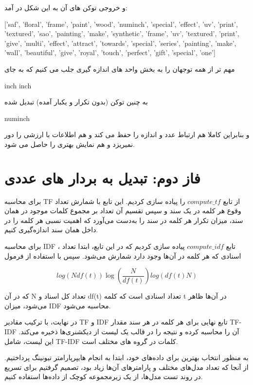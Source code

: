\documentclass[a4paper,12pt]{article}
\begin{document}
	و خروجی توکن های آن به این شکل در آمد:
	\begin{latin}
		['saf', 'floral', 'frame', 'paint', 'wood', 'numinch', 'special', 'effect', 'uv', 'print', 'textured', 'sao', 'painting', 'make', 'synthetic', 'frame', 'uv', 'textured', 'print', 'give', 'multi', 'effect', 'attract', 'towards', 'special', 'series', 'painting', 'make', 'wall', 'beautiful', 'give', 'royal', 'touch', 'perfect', 'gift', 'special', 'one']
	\end{latin}
	
	مهم تر از همه توجهان را به بخش واحد های اندازه گیری جلب می کنیم که به جای 
	\begin{latin}
		inch inch 
	\end{latin}
	به چنین توکن (بدون تکرار و یکبار آمده) تبدیل شده
	\begin{latin}
		numinch
	\end{latin}
	و بنابراین کاملا هم ارتباط عدد و اندازه را حفظ می کند و هم اطلاعات با ارزشی را دور نمیریزد و هم نمایش بهتری را حاصل می شود.
	
	\pagebreak
	
	\section{فاز دوم: تبدیل به بردار های عددی}
	
	برای محاسبه TF از تابع
	$compute\_tf $
	را پیاده سازی کردیم.
	این تابع با شمارش تعداد وقوع هر کلمه در یک سند و سپس تقسیم آن تعداد بر مجموع کلمات موجود در همان سند، میزان تکرار هر کلمه در سند را به‌دست می‌آورد که اهمیت نسبی هر کلمه را در داخل همان سند اندازه‌گیری کنیم.
	
	برای محاسبه IDF 
	، 
	تابع 
	$compute\_idf$
	پیاده سازی کردیم که در این تابع، ابتدا تعداد اسنادی که هر کلمه در آن‌ها وجود دارد شمارش می‌شود. سپس با استفاده از فرمول 
	
	$$log⁡(Ndf(t))\log \left( \frac{N}{df(t)} \right)log(df(t)N​)$$
	
	که در آن N تعداد کل اسناد و df(t) تعداد اسنادی است که کلمه t در آن‌ها ظاهر می‌شود، میزان IDF محاسبه می‌شود. 
	
	
	در نهایت، با ترکیب مقادیر TF و IDF تابع نهایی برای هر کلمه در هر سند مقدار TF-IDF آن را محاسبه کرده و نتیجه را در قالب یک لیست از دیکشنری‌ها ذخیره می‌کند. این لیست، شامل TF-IDF کلمات در گروه های مختلف است.
	
	
	به منظور انتخاب بهترین  برای داده‌های خود، ابتدا به انجام هایپرپارامتر 
	تیونینگ پرداختیم. از آنجا که تعداد مدل‌های مختلف و پارامترهای آن‌ها زیاد بود، 
	تصمیم گرفتیم برای تسریع در روند تست مدل‌ها، از یک زیرمجموعه کوچک از داده‌ها 
	استفاده کنیم.
	
\end{document}
